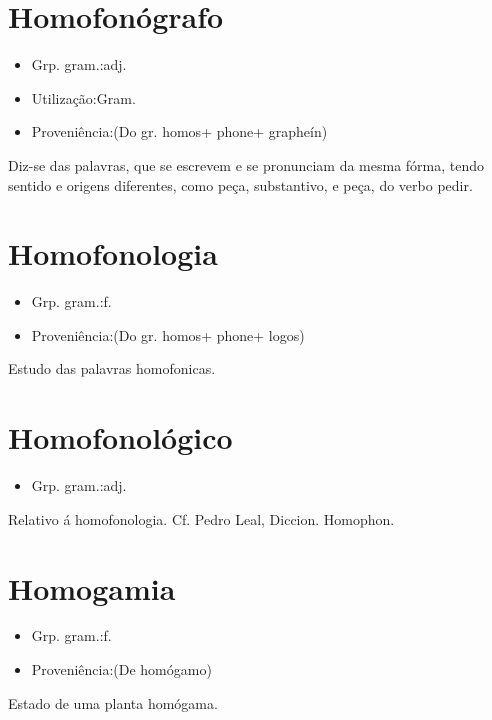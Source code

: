 \documentclass{article}
\begin{document}
\section{Homofonógrafo}
\begin{itemize}
\item {Grp. gram.:adj.}
\end{itemize}
\begin{itemize}
\item {Utilização:Gram.}
\end{itemize}
\begin{itemize}
\item {Proveniência:(Do gr. \textunderscore homos\textunderscore  + \textunderscore phone\textunderscore  + \textunderscore grapheín\textunderscore )}
\end{itemize}
Diz-se das palavras, que se escrevem e se pronunciam da mesma fórma, tendo sentido e origens diferentes, como \textunderscore peça\textunderscore , substantivo, e \textunderscore peça\textunderscore , do verbo \textunderscore pedir\textunderscore .
\section{Homofonologia}
\begin{itemize}
\item {Grp. gram.:f.}
\end{itemize}
\begin{itemize}
\item {Proveniência:(Do gr. \textunderscore homos\textunderscore  + \textunderscore phone\textunderscore  + \textunderscore logos\textunderscore )}
\end{itemize}
Estudo das palavras homofonicas.
\section{Homofonológico}
\begin{itemize}
\item {Grp. gram.:adj.}
\end{itemize}
Relativo á homofonologia. Cf. Pedro Leal, \textunderscore Diccion. Homophon.\textunderscore 
\section{Homogamia}
\begin{itemize}
\item {Grp. gram.:f.}
\end{itemize}
\begin{itemize}
\item {Proveniência:(De \textunderscore homógamo\textunderscore )}
\end{itemize}
Estado de uma planta homógama.
\end{document}
